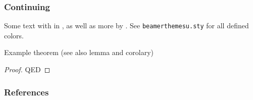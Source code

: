 \documentclass[%
	smaller%
]{beamer}
\begin{document}

	\begin{frame}[fragile] %
		\frametitle{Continuing}

		Some text with  in , as well as more
		 by . See {\small
		\verb|beamerthemesu.sty|} for all defined colors.

		\vfill
		\begin{theorem}[Theorem]
			Example theorem (see also lemma and corolary)
		\end{theorem}
		\begin{proof}
			QED
		\end{proof}
	\end{frame}

	\backmatter %

	\begin{frame}
		\frametitle{References}
		\nocite{*}
		
	\end{frame}
\end{document}
